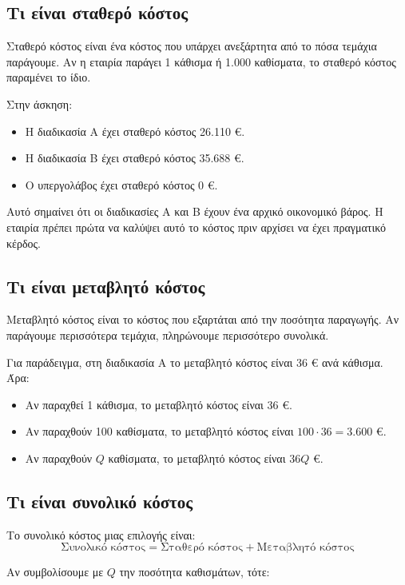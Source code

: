 \documentclass[12pt,a4paper]{article}
\begin{document}
\subsection{Τι είναι σταθερό κόστος}

Σταθερό κόστος είναι ένα κόστος που υπάρχει ανεξάρτητα από το πόσα τεμάχια παράγουμε. Αν η εταιρία παράγει 1 κάθισμα ή 1.000 καθίσματα, το σταθερό κόστος παραμένει το ίδιο.

Στην άσκηση:

\begin{itemize}
    \item Η διαδικασία Α έχει σταθερό κόστος 26.110 €.
    \item Η διαδικασία Β έχει σταθερό κόστος 35.688 €.
    \item Ο υπεργολάβος έχει σταθερό κόστος 0 €.
\end{itemize}

Αυτό σημαίνει ότι οι διαδικασίες Α και Β έχουν ένα αρχικό οικονομικό βάρος. Η εταιρία πρέπει πρώτα να καλύψει αυτό το κόστος πριν αρχίσει να έχει πραγματικό κέρδος.

\subsection{Τι είναι μεταβλητό κόστος}

Μεταβλητό κόστος είναι το κόστος που εξαρτάται από την ποσότητα παραγωγής. Αν παράγουμε περισσότερα τεμάχια, πληρώνουμε περισσότερο συνολικά.

Για παράδειγμα, στη διαδικασία Α το μεταβλητό κόστος είναι 36 € ανά κάθισμα. Άρα:

\begin{itemize}
    \item Αν παραχθεί 1 κάθισμα, το μεταβλητό κόστος είναι 36 €.
    \item Αν παραχθούν 100 καθίσματα, το μεταβλητό κόστος είναι \(100 \cdot 36 = 3.600\) €.
    \item Αν παραχθούν \(Q\) καθίσματα, το μεταβλητό κόστος είναι \(36Q\) €.
\end{itemize}

\subsection{Τι είναι συνολικό κόστος}

Το συνολικό κόστος μιας επιλογής είναι:
\[
\text{Συνολικό κόστος} = \text{Σταθερό κόστος} + \text{Μεταβλητό κόστος}
\]

Αν συμβολίσουμε με \(Q\) την ποσότητα καθισμάτων, τότε:
\end{document}
